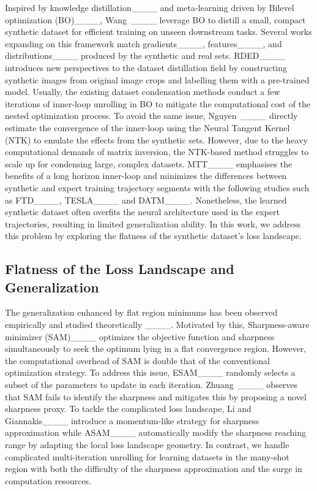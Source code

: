 Inspired by knowledge distillation____ and meta-learning driven by Bilevel optimization (BO)____, Wang~\etal____ leverage BO to distill a small, compact synthetic dataset for efficient training on unseen downstream tasks. Several works expanding on this framework match gradients____, features____, and distributions____ produced by the synthetic and real sets. RDED____ introduces new perspectives to the dataset distillation field by constructing synthetic images from original image crops and labelling them with a pre-trained model. Usually, the existing dataset condensation methods conduct a few iterations of inner-loop unrolling in BO to mitigate the computational cost of the nested optimization process. To avoid the same issue, Nguyen~\etal____ directly estimate the convergence of the inner-loop using the Neural Tangent Kernel (NTK) to emulate the effects from the synthetic sets. However, due to the heavy computational demands of matrix inversion, the NTK-based method struggles to scale up for condensing large, complex datasets. MTT____ emphasises the benefits of a long horizon inner-loop and minimizes the differences between synthetic and expert training trajectory segments with the following studies such as FTD____, TESLA____ and DATM____. Nonetheless, the learned synthetic dataset often overfits the neural architecture used in the expert trajectories, resulting in limited generalization ability. In this work, we address this problem by exploring the flatness of the synthetic dataset's loss landscape.

\subsection{Flatness of the Loss Landscape and Generalization} The generalization enhanced by flat region minimums has been observed empirically and studied theoretically ____. Motivated by this, Sharpness-aware minimizer (SAM)____ optimizes the objective function and sharpness simultaneously to seek the optimum lying in a flat convergence region. However, the computational overhead of SAM is double that of the conventional optimization strategy. To address this issue, ESAM____ randomly selects a subset of the parameters to update in each iteration. Zhuang~\etal____ observes that SAM fails to identify the sharpness and mitigates this by proposing a novel sharpness proxy. To tackle the complicated loss landscape, Li and Giannakis____ introduce a momentum-like strategy for sharpness approximation while ASAM____ automatically modify the sharpness reaching range by adapting the local loss landscape geometry. In contrast, we handle complicated multi-iteration unrolling for learning datasets in the many-shot region with both the difficulty of the sharpness approximation and the surge in computation resources.

